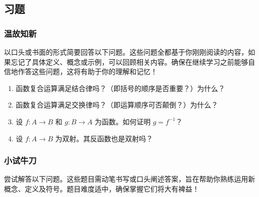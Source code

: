 
\subsection{习题}\label{sec:section7.5.4}

\subsubsection*{温故知新}

以口头或书面的形式简要回答以下问题。这些问题全都基于你刚刚阅读的内容，如果忘记了具体定义、概念或示例，可以回顾相关内容。确保在继续学习之前能够自信地作答这些问题，这将有助于你的理解和记忆！

\begin{enumerate}[label=(\arabic*)]
    \item 函数复合运算满足结合律吗？（即括号的顺序是否重要？）为什么？
    \item 函数复合运算满足交换律吗？（即运算顺序可否颠倒？）为什么？
    \item 设 $f : A \to B$ 和 $g : B \to A$ 为函数。如何证明 $g = f^{-1}$？
    \item 设 $f : A \to B$ 为双射。其反函数也是双射吗？
\end{enumerate}

\subsubsection*{小试牛刀}

尝试解答以下问题。这些题目需动笔书写或口头阐述答案，旨在帮助你熟练运用新概念、定义及符号。题目难度适中，确保掌握它们将大有裨益！

